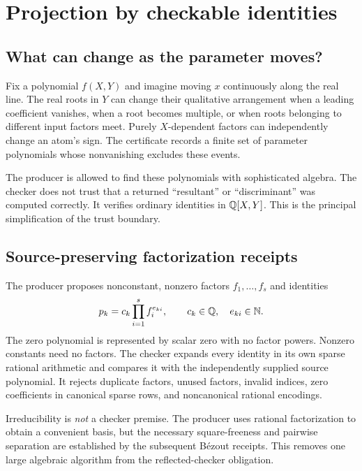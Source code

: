 \section{Projection by checkable identities}
\label{sec:projection}
\subsection{What can change as the parameter moves?}
Fix a polynomial $f(X,Y)$ and imagine moving $x$ continuously along the real line. The real roots in $Y$ can change their qualitative arrangement when a leading coefficient vanishes, when a root becomes multiple, or when roots belonging to different input factors meet. Purely $X$-dependent factors can independently change an atom's sign. The certificate records a finite set of parameter polynomials whose nonvanishing excludes these events.

The producer is allowed to find these polynomials with sophisticated algebra. The checker does not trust that a returned ``resultant'' or ``discriminant'' was computed correctly. It verifies ordinary identities in $\mathbb Q[X,Y]$. This is the principal simplification of the trust boundary.

\subsection{Source-preserving factorization receipts}
The producer proposes nonconstant, nonzero factors $f_1,\ldots,f_s$ and identities
\begin{equation}\label{eq:factor}
 p_k=c_k\prod_{i=1}^{s}f_i^{e_{ki}},\qquad
 c_k\in\mathbb Q,\quad e_{ki}\in\mathbb N.
\end{equation}
The zero polynomial is represented by scalar zero with no factor powers. Nonzero constants need no factors. The checker expands every identity in its own sparse rational arithmetic and compares it with the independently supplied source polynomial. It rejects duplicate factors, unused factors, invalid indices, zero coefficients in canonical sparse rows, and noncanonical rational encodings.

Irreducibility is \emph{not} a checker premise. The producer uses rational factorization to obtain a convenient basis, but the necessary square-freeness and pairwise separation are established by the subsequent B\'ezout receipts. This removes one large algebraic algorithm from the reflected-checker obligation.

